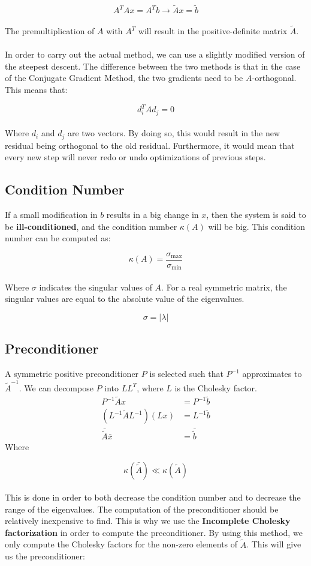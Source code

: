 \documentclass{article}
\begin{document}
\[ A^TAx = A^Tb \rightarrow \tilde{A}x = \tilde{b} \] \\
The premultiplication of $A$ with $A^T$ will result in the positive-definite matrix $\tilde{A}$. \\ \\
In order to carry out the actual method, we can use a slightly modified version of the steepest descent. The difference between the two methods is that in the case of the Conjugate Gradient Method, the two gradients need to be $A$-orthogonal. This means that:

\[ d^T_i A d_j = 0 \] \\
Where $d_i$ and $d_j$ are two vectors. By doing so, this would result in the new residual being orthogonal to the old residual. Furthermore, it would mean that every new step will never redo or undo optimizations of previous steps.

\subsection{Condition Number}
If a small modification in $b$ results in a big change in $x$, then the system is said to be \textbf{ill-conditioned}, and the condition number $\kappa(A)$ will be big. This condition number can be computed as:

\[ \kappa(A) = \frac{\sigma_{\max}}{\sigma_{\min}} \] \\
Where $\sigma$ indicates the singular values of $A$. For a real symmetric matrix, the singular values are equal to the absolute value of the eigenvalues.

\[ \sigma = |\lambda| \]

\subsection{Preconditioner}
A symmetric positive preconditioner $P$ is selected such that $P^{-1}$ approximates to $\tilde{A}^{-1}$. We can decompose $P$ into $LL^T$, where $L$ is the Cholesky factor.
\begin{align*}
	P^{-1}\tilde{A}x & = P^{-1}\tilde{b} \\
	(L^{-1}\tilde{A}L^{-1})(Lx) & = L^{-1}\tilde{b} \\
	\bar{\tilde{A}}\bar{x} & = \bar{\tilde{b}}
\end{align*}
Where

\[ \kappa(\bar{\tilde{A}}) \ll \kappa(\tilde{A}) \]\\
This is done in order to both decrease the condition number and to decrease the range of the eigenvalues.
The computation of the preconditioner should be relatively inexpensive to find. This is why we use the \textbf{Incomplete Cholesky factorization} in order to compute the preconditioner. By using this method, we only compute the Cholesky factors for the non-zero elements of $\tilde{A}$. This will give us the preconditioner:
\end{document}
